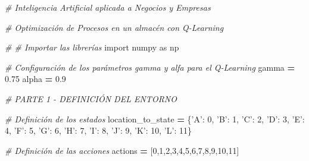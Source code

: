 \documentclass[]{book}
\newenvironment{Shaded}{\begin{snugshade}}{\end{snugshade}}
\newcommand{\CommentTok}[1]{\textcolor[rgb]{0.56,0.35,0.01}{\textit{#1}}}
\newcommand{\DecValTok}[1]{\textcolor[rgb]{0.00,0.00,0.81}{#1}}
\newcommand{\FloatTok}[1]{\textcolor[rgb]{0.00,0.00,0.81}{#1}}
\newcommand{\ImportTok}[1]{#1}
\newcommand{\NormalTok}[1]{#1}
\newcommand{\OperatorTok}[1]{\textcolor[rgb]{0.81,0.36,0.00}{\textbf{#1}}}
\newcommand{\StringTok}[1]{\textcolor[rgb]{0.31,0.60,0.02}{#1}}
\begin{document}
\begin{Shaded}
\begin{Highlighting}[]
\CommentTok{# Inteligencia Artificial aplicada a Negocios y Empresas}

\CommentTok{# Optimización de Procesos en un almacén con Q-Learning}

\CommentTok{# # Importar las librerías}
\ImportTok{import}\NormalTok{ numpy }\ImportTok{as}\NormalTok{ np}

\CommentTok{# Configuración de los parámetros gamma y alfa para el Q-Learning}
\NormalTok{gamma }\OperatorTok{=} \FloatTok{0.75}
\NormalTok{alpha }\OperatorTok{=} \FloatTok{0.9}

\CommentTok{# PARTE 1 - DEFINICIÓN DEL ENTORNO}

\CommentTok{# Definición de los estados}
\NormalTok{location_to_state }\OperatorTok{=}\NormalTok{ \{}\StringTok{'A'}\NormalTok{: }\DecValTok{0}\NormalTok{,}
                     \StringTok{'B'}\NormalTok{: }\DecValTok{1}\NormalTok{,}
                     \StringTok{'C'}\NormalTok{: }\DecValTok{2}\NormalTok{,}
                     \StringTok{'D'}\NormalTok{: }\DecValTok{3}\NormalTok{,}
                     \StringTok{'E'}\NormalTok{: }\DecValTok{4}\NormalTok{,}
                     \StringTok{'F'}\NormalTok{: }\DecValTok{5}\NormalTok{,}
                     \StringTok{'G'}\NormalTok{: }\DecValTok{6}\NormalTok{,}
                     \StringTok{'H'}\NormalTok{: }\DecValTok{7}\NormalTok{,}
                     \StringTok{'I'}\NormalTok{: }\DecValTok{8}\NormalTok{,}
                     \StringTok{'J'}\NormalTok{: }\DecValTok{9}\NormalTok{,}
                     \StringTok{'K'}\NormalTok{: }\DecValTok{10}\NormalTok{,}
                     \StringTok{'L'}\NormalTok{: }\DecValTok{11}\NormalTok{\}}

\CommentTok{# Definición de las acciones}
\NormalTok{actions }\OperatorTok{=}\NormalTok{ [}\DecValTok{0}\NormalTok{,}\DecValTok{1}\NormalTok{,}\DecValTok{2}\NormalTok{,}\DecValTok{3}\NormalTok{,}\DecValTok{4}\NormalTok{,}\DecValTok{5}\NormalTok{,}\DecValTok{6}\NormalTok{,}\DecValTok{7}\NormalTok{,}\DecValTok{8}\NormalTok{,}\DecValTok{9}\NormalTok{,}\DecValTok{10}\NormalTok{,}\DecValTok{11}\NormalTok{]}


\end{Highlighting}
\end{Shaded}
\end{document}
